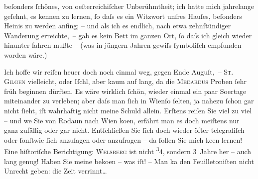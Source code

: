                beſonders ſchönes, von oeſterreichiſcher
               Unberühmtheit; ich hatte mich jahrelange geſehnt, es kennen zu lernen, ſo daſs es ein
               Witzwort unſres Hauſes, beſonders Heinis zu
               werden anfing; – und als {\pb}ich es endlich, nach etwa
               zehnſtündiger Wanderung erreichte, – gab es kein Bett im ganzen Ort, ſo daſs ich
               gleich wieder hinunter fahren mußte – (was in jüngern Jahren gewiſs ſymboliſch
               empfunden worden wäre.)\pend
           
\pstart
           Ich hoffe wir reiſen heuer doch noch einmal weg, gegen Ende Auguſt, –
                  \textsc{St. Gilgen} vielleicht, oder Iſchl, aber kaum auf lang,
               da die \textsc{Medardus} Proben ſehr früh beginnen dürften. \strikeout{\textcolor{gray}{Also}} Es wäre wirklich ſchön, wieder einmal ein paar So{\geminationm}ertage miteinander zu verleben; aber daſs man ſich in Wienſo ſelten, ja nahezu ſchon gar nicht ſieht, iſt
               wahrhaftig nicht {\pb}meine Schuld allein. Erſtens reiſen Sie
               viel zu viel – und we{\geminationn} Sie von Rodaun nach Wien ko{\geminationm}en, erfährt man es doch meiſtens nur ganz zufällig oder
               gar nicht. Entſchließen Sie ſich doch wieder öfter telegrafiſch oder ſonſtwie ſich
               anzuſagen oder anzufragen – da{\geminationn} ſollen Sie mich ke{\geminationn}en lernen! Eine hiſtoriſche Berichtigung: \textsc{Welsberg} ist nicht \substVorne{}\textsuperscript{3}\substDazwischen{}4\substHinten{}, sondern 3 Jahre her – auch lang genug! Haben Sie meine \label{K_L01952-4v}\label{K_L01952-4} beko{\geminationm}en – was \label{K_L01952-5v}\label{K_L01952-5} iſt! – Man ka{\geminationn} den Feuilletoniſten nicht Unrecht
               geben: die Zeit verrinnt{\dots}\pend
           
